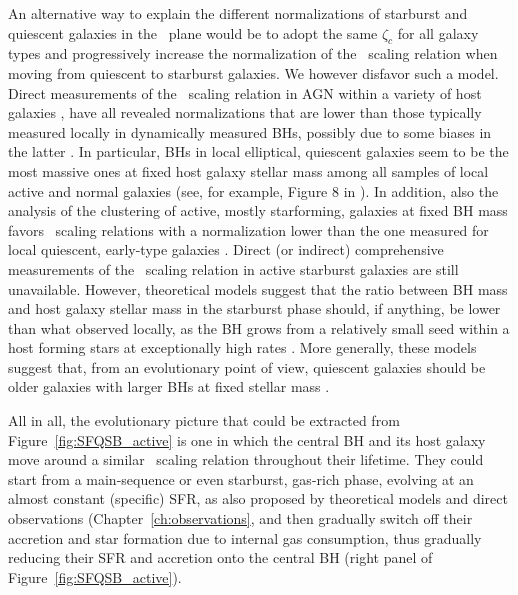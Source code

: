 An alternative way to explain the different normalizations of starburst and quiescent galaxies
in the \LXMS\ plane would be to adopt the same $\zeta_c$ for all galaxy types and progressively
increase the normalization of the \MBHMS\ scaling relation when moving from quiescent to
starburst galaxies.
We however disfavor such a model. Direct measurements of the \MBHMS\ scaling relation in
AGN within a variety of host galaxies
\citep[e.g.,][and references therein]{2015ApJ...813...82R,2019MNRAS.485.1278S,2020ApJ...889...32S},
have all revealed normalizations that are lower than those typically measured locally
in dynamically measured BHs, possibly due to some biases in the latter
\citep[e.g.,][]{2016MNRAS.460.3119S}. In particular, BHs in local elliptical, quiescent
galaxies seem to be the most massive ones at fixed host galaxy stellar mass among all
samples of local active and normal galaxies (see, for example, Figure 8 in
\citealt{2015ApJ...813...82R}). In addition, also the analysis of the clustering of active,
mostly starforming, galaxies at fixed BH mass favors \MBHMS\ scaling relations with a
normalization lower than the one measured for local quiescent, early-type galaxies
\citep[e.g.,][]{ShankarNat,Allevato21,Viita21}. Direct (or indirect) comprehensive
measurements of the \MBHMS\ scaling relation in active starburst galaxies are still
unavailable. However, theoretical models suggest that the ratio between BH mass and host
galaxy stellar mass in the starburst phase should, if anything, be lower than what observed
locally, as the BH grows from a relatively small seed within a host forming stars at
exceptionally high rates \citep[see, e.g.,][their Figure 3]{2014ApJ...782...69L}. More generally, these
models suggest that, from an evolutionary point of view, quiescent galaxies should be older
galaxies with larger BHs at fixed stellar mass
\citep[e.g.,][]{Ciras05,Granato06,2006ApJ...650...42L,shankar06,2018ApJ...857...22L}.

All in all, the evolutionary picture that could be extracted from
Figure~\ref{fig:SFQSB_active} is one in which the central BH and its host galaxy move around
a similar \MBHMS\ scaling relation throughout their lifetime. They could start from a
main-sequence or even starburst, gas-rich phase, evolving at an almost constant (specific)
SFR, as also proposed by theoretical models \citep[e.g.][]{2014ApJ...782...69L, Aversa15} and direct
observations (Chapter~\ref{ch:observations}, and then gradually switch off their accretion
and star formation due to internal gas consumption, thus gradually reducing their SFR and
accretion onto the central BH (right panel of Figure~\ref{fig:SFQSB_active}). 

